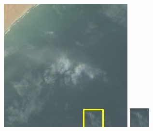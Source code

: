 \documentclass[UTF8]{ctexart}
\begin{document}
\begin{figure}[H]
{\begin{minipage}[b]{0.15\linewidth}
            \vspace{4pt}
            \includegraphics[width=1\linewidth]{../log/cut/LC81570452014213LGN00_06157_color.jpg}\vspace{4pt}
            \includegraphics[width=1\linewidth]{../log/cut/tmp_cut_LC81570452014213LGN00_06157_color.jpg}

\end{minipage}}
\end{figure}
\end{document}

